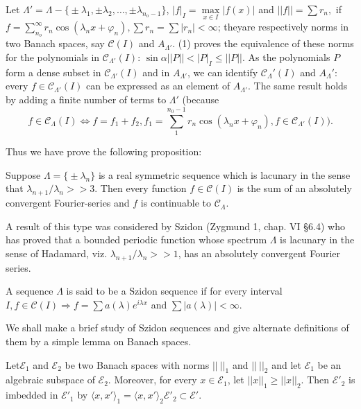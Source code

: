 Let $\Lambda' = \Lambda - \big \{ \pm \lambda_1, \pm \lambda_2, \ldots
, \pm \lambda_{n_o-1} \big \}$, $\big | f \big |_I = \max\limits_{x
 \in I} \big | f(x) \big |$ and $ || f || = \sum r_n, $ if $f =
\sum\limits_{n_o}^\infty r_n \cos (\lambda_n x + \varphi_n), \sum r_n
= \sum \big | r_n \big | < \infty$; they\pageoriginale are respectively norms in two
Banach spaces, say $\mathscr{C} (I)$ and $A_{\Lambda'}$. (1) proves
the equivalence of these norms for the polynomials in
$\mathscr{C}_{\Lambda'} (I)$: $\sin \alpha || P || < | P |_I \le || P
||$. As the polynomials $P$ form a dense subset in
$\mathscr{C}_{\Lambda'}(I)$ and in $A_{\Lambda'}$, we can identify
$\mathscr{C}_\Lambda' (I)$ and $A_\Lambda'$: every $f \in
\mathscr{C}_{\Lambda'}(I)$ can be expressed as an element of
$A_{\Lambda'}$. The same result holds by adding a finite number of
terms to $\Lambda'$ (because 
$$
f \in \mathscr{C}_\Lambda (I) \Leftrightarrow f=f_1 + f_2, f_1 = \sum_1^{n_0-1}
r_n \cos (\lambda_n x + \varphi_n), f \in \mathscr{C}_{\Lambda'} (I)
). 
$$

Thus we have prove the following proposition:

\begin{prop*} %
 Suppose $\Lambda = \big \{ \pm \lambda_n \big\}$ is a real symmetric
 sequence which is lacunary in the sense that $\lambda_{n + 1}/
 \lambda_n >> 3$. Then every function $f \in \mathscr{C} (I)$ is the
 sum of an absolutely convergent Fourier-series and $f$ is
 continuable to $\mathscr{C}_\Lambda$. 
\end{prop*}
 
A result of this type was considered by Szidon (Zygmund 1, chap. VI
\S 6.4) who has proved that a bounded periodic function whose
spectrum $\Lambda$ is lacunary in the sense of Hadamard,
viz. $\lambda_{n + 1} / \lambda_n >> 1$, has an absolutely convergent
Fourier series. 

\begin{defi*}
 A sequence $\Lambda$ is said to be a Szidon sequence if for every
 interval $I, f \in \mathscr{C} (I) \Rightarrow f = \sum a (\lambda)
 e^{i \lambda x}$ and $\sum \big | a (\lambda) \big | < \infty$. 
\end{defi*}

We shall make a brief study of Szidon sequences and give alternate
definitions of them by a simple lemma on Banach spaces. 

Let\pageoriginale $\mathscr{E}_1$ and $\mathscr{E}_2$ be two Banach spaces with
norms $|| ~ ||_1$ and $|| ~ ||_2$ and let $\mathscr{E}_1$ be an
algebraic subspace of $\mathscr{E}_2$. Moreover, for every $x \in
\mathscr{E}_1$, let $|| x ||_1 \ge || x ||_2$. Then $\mathscr{E}'_2$
is imbedded in $\mathscr{E}'_1$ by $\langle x, x' \rangle_1 = \langle
x, x' \rangle_2 \mathscr{E}'_2 \subset \mathscr{E}'$. 

